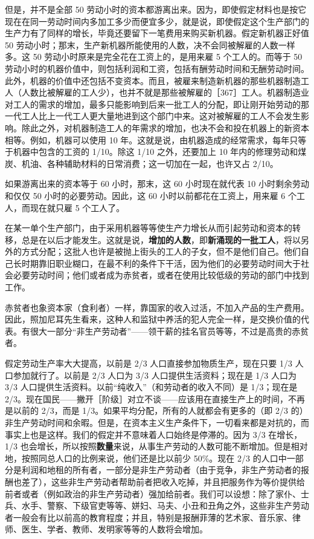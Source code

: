 但是，并不是全部 50 劳动小时的资本都游离出来。因为，即使假定材料也是按它现在在同一劳动时间内多加工多少而便宜多少，就是说，即使假定这个生产部门的生产力有了同样的增长，毕竟还要留下一笔费用来购买新机器。假定新机器正好值 50 劳动小时；那末，生产新机器所能使用的人数，决不会同被解雇的人数一样多。这 50 劳动小时原来是完全花在工资上的，是用来雇 5 个工人的。而等于 50 劳动小时的机器价值中，则包括利润和工资，包括有酬劳动时间和无酬劳动时间。此外，机器的价值中还包括不变资本。而且，被雇来制造新机器的那些机器制造工人（人数比被解雇的工人少），也并不就是那些被解雇的［367］工人。机器制造业对工人的需求的增加，最多只能影响到后来一批工人的分配，即让刚开始劳动的那一代工人比上一代工人更大量地进到这个部门中来。这对被解雇的工人不会发生影响。除此之外，对机器制造工人的年需求的增加，也决不会和投在机器上的新资本相等。例如，机器可以使用 10 年。这就是说，由机器造成的经常需求，每年只等于机器中包含的工资的 1/10。除这 1/10 之外，还要加上 10 年内的修理劳动和煤炭、机油、各种辅助材料的日常消费；这一切加在一起，也许又占 2/10。

\fontbox{~\{}如果游离出来的资本等于 60 小时，那末，这 60 小时现在就代表 10 小时剩余劳动和仅仅 50 小时的必要劳动。因此，这 60 小时以前都花在工资上，用来雇 6 个工人，而现在就只雇 5 个工人了。\fontbox{\}~}

\fontbox{~\{}在某一单个生产部门，由于采用机器等等使生产力增长从而引起劳动和资本的转移，总是在以后才能发生。这就是说，\textbf{增加的人数}，即\textbf{新涌现的一批工人}，将以另外的方式分配；这批人也许是被抛上街头的工人的子女，但不是他们自己。他们自己长时期靠旧职业糊口，在最不利的条件下干活，因为他们的必要劳动时间大于社会必要劳动时间；他们或者成为赤贫者，或者在使用比较低级的劳动的部门中找到工作。\fontbox{\}~}

\fontbox{~\{}赤贫者也象资本家（食利者）一样，靠国家的收入过活，不加入产品的生产费用。因此，照加尼耳先生看来，这种人和监狱中养活的犯人完全一样，是交换价值的代表。有很大一部分“非生产劳动者”——领干薪的挂名官员等等，不过是高贵的赤贫者。\fontbox{\}~}

\fontbox{~\{}假定劳动生产率大大提高，以前是 2/3 人口直接参加物质生产，现在只要 1/3 人口参加就行了。以前是 2/3 人口为 3/3 人口提供生活资料；现在是 1/3 人口为 3/3 人口提供生活资料。以前“纯收入”（和劳动者的收入不同）是 1/3；现在是 2/3。现在国民——撇开［阶级］对立不谈——应该用在直接生产上的时间，不再是以前的 2/3，而是 1/3。如果平均分配，所有的人就都会有更多的（即 2/3 的）非生产劳动时间和余暇。但是，在资本主义生产条件下，一切看来都是对抗的，而事实上也是这样。我们的假定并不意味着人口始终是停滞的。因为 3/3 在增长，1/3 也会增长，所以按照\textbf{数量}来说，从事生产劳动的人数可能不断增加。但是相对地，按照同总人口的比例来说，他们还是比以前少 50\%。现在 2/3 的人口中一部分是利润和地租的所有者，一部分是非生产劳动者（由于竞争，非生产劳动者的报酬也差了），这些非生产劳动者帮助前者把收入吃掉，并且把服务作为等价提供给前者或者（例如政治的非生产劳动者）强加给前者。我们可以设想：除了家仆、士兵、水手、警察、下级官吏等等、姘妇、马夫、小丑和丑角之外，这些非生产劳动者一般会有比以前高的教育程度；并且，特别是报酬菲薄的艺术家、音乐家、律师、医生、学者、教师、发明家等等的人数将会增加。

